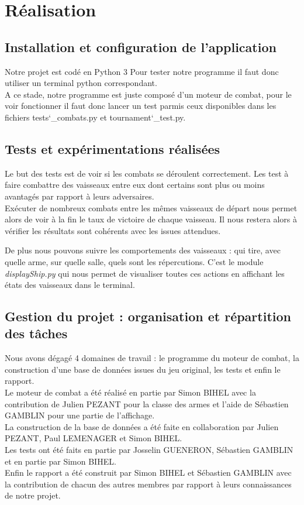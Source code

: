 \chapter{Réalisation}

	\section{Installation et configuration de l'application}
	
Notre projet est codé en Python 3 Pour tester notre programme il faut donc utiliser un terminal python correspondant.\\
A ce stade, notre programme est juste composé d'un moteur de combat, pour le voir fonctionner il faut donc lancer un test parmis ceux disponibles dans les fichiers tests\char`_combats.py et tournament\char`_test.py.


	\section{Tests et expérimentations réalisées}
	
Le but des tests est de voir si les combats se déroulent correctement. Les test à faire combattre des vaisseaux entre eux dont certains sont plus ou moins avantagés par rapport à leurs adversaires.\\
Exécuter de nombreux combats entre les mêmes vaisseaux de départ nous permet alors de voir à la fin le taux de victoire de chaque vaisseau. Il nous restera alors à vérifier les résultats sont cohérents avec les issues attendues.

De plus nous pouvons suivre les comportements des vaisseaux : qui tire, avec quelle arme, sur quelle salle, quels sont les répercutions. C'est le module \textit{displayShip.py} qui nous permet de visualiser toutes ces actions en affichant les états des vaisseaux dans le terminal.
	
	
	\section{Gestion du projet : organisation et répartition des tâches}
	
Nous avons dégagé 4 domaines de travail : le programme du moteur de combat, la construction d'une base de données issues du jeu original, les tests et enfin le rapport.\\
Le moteur de combat a été réalisé en partie par Simon BIHEL avec la contribution de Julien PEZANT pour la classe des armes et l'aide de Sébastien GAMBLIN pour une partie de l'affichage.\\
La construction de la base de données a été faite en collaboration par Julien PEZANT, Paul LEMENAGER et Simon BIHEL.\\
Les tests ont été faits en partie par Josselin GUENERON, Sébastien GAMBLIN et en partie par Simon BIHEL.\\
Enfin le rapport a été construit par Simon BIHEL et Sébastien GAMBLIN avec la contribution de chacun des autres membres par rapport à leurs connaissances de notre projet.
